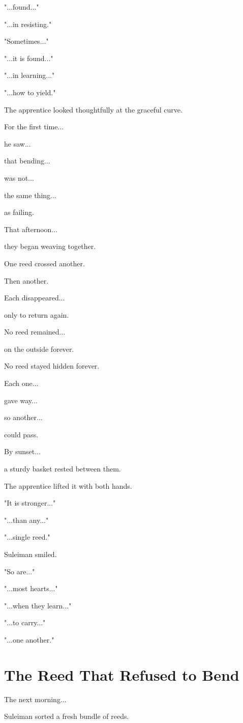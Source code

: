 \documentclass[12pt,openany]{book}
\begin{document}
"...found..."

"...in resisting."

"Sometimes..."

"...it is found..."

"...in learning..."

"...how to yield."

The apprentice looked thoughtfully at the graceful curve.

For the first time...

he saw...

that bending...

was not...

the same thing...

as failing.

That afternoon...

they began weaving together.

One reed crossed another.

Then another.

Each disappeared...

only to return again.

No reed remained...

on the outside forever.

No reed stayed hidden forever.

Each one...

gave way...

so another...

could pass.

By sunset...

a sturdy basket rested between them.

The apprentice lifted it with both hands.

"It is stronger..."

"...than any..."

"...single reed."

Suleiman smiled.

"So are..."

"...most hearts..."

"...when they learn..."

"...to carry..."

"...one another."
\section*{The Reed That Refused to Bend}

The next morning...

Suleiman sorted a fresh bundle of reeds.
\end{document}
